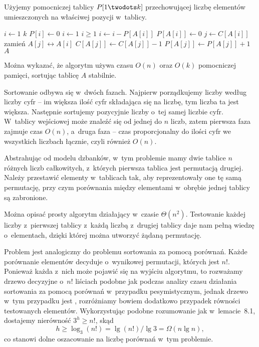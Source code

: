 \subproblem %
Użyjemy pomocniczej tablicy $P[1\twodots k]$ przechowującej liczbę elementów umieszczonych na właściwej pozycji w~tablicy.
\begin{codebox}
\li	\For $i\gets1$ \To $k$
\li		\Do $P[i]\gets0$
		\End
\li	$i\gets1$
\li	\While $i\ge1$
\li		\Do
			$i\gets i-P[A[i]]$
\li			$P[A[i]]\gets0$
\li			$j\gets C[A[i]]$
\li			zamień $A[j]\leftrightarrow A[i]$
\li			$C[A[j]]\gets C[A[j]]-1$
\li			$P[A[j]]\gets P[A[j]]+1$
		\End
\li	\Return $A$
\end{codebox}

Można wykazać, że algorytm używa czasu $O(n)$ oraz $O(k)$ pomocniczej pamięci, sortując tablicę $A$ stabilnie.


\subproblem %
Sortowanie odbywa się w~dwóch fazach. Najpierw porządkujemy liczby według liczby cyfr -- im większa ilość cyfr składająca się na liczbę, tym liczba ta jest większa. Następnie sortujemy pozycyjnie liczby o~tej samej liczbie cyfr. W~tablicy wejściowej może znaleźć się od jednej do $n$ liczb, zatem pierwsza faza zajmuje czas $O(n)$, a~druga faza -- czas proporcjonalny do ilości cyfr we wszystkich liczbach łącznie, czyli również $O(n)$.

\subproblem %


\subproblem %
Abstrahując od modelu dzbanków, w~tym problemie mamy dwie tablice $n$ różnych liczb całkowitych, z~których pierwsza tablica jest permutacją drugiej. Należy przestawić elementy w~tablicach tak, aby reprezentowały one tę samą permutację, przy czym porównania między elementami w~obrębie jednej tablicy są zabronione.

Można opisać prosty algorytm działający w~czasie $\Theta(n^2)$. Testowanie każdej liczby z~pierwszej tablicy z~każdą liczbą z~drugiej tablicy daje nam pełną wiedzę o~elementach, dzięki której można utworzyć żądaną permutację.

\subproblem %
Problem jest analogiczny do problemu sortowania za pomocą porównań. Każde porównanie elementów decyduje o~wynikowej permutacji, których jest $n!$. Ponieważ każda z~nich może pojawić się na wyjściu algorytmu, to rozważamy drzewo decyzyjne o~$n!$ liściach podobne jak podczas analizy czasu działania sortowania za pomocą porównań w~przypadku pesymistycznym, jednak drzewo w~tym przypadku jest , rozróżniamy bowiem dodatkowo przypadek równości testowanych elementów. Wykorzystując podobne rozumowanie jak w~lemacie~8.1, dostajemy nierówność $3^h\ge n!$, skąd
\[
	h \ge \log_3(n!) = \lg(n!)/\!\lg3 = \Omega(n\lg n),
\]
co stanowi dolne oszacowanie na liczbę porównań w~tym problemie.

